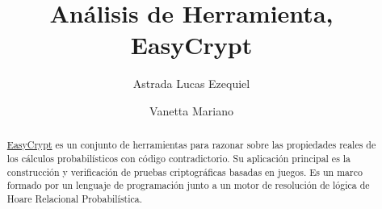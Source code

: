 \documentclass[runningheads,a4paper]{llncs}
\begin{document}
\mainmatter  %

\title{Análisis de Herramienta, EasyCrypt}


%
%
\author
{
Astrada Lucas Ezequiel
\and
Vanetta Mariano
}
%


%
%

\maketitle


\begin{abstract}    
\href{https://www.easycrypt.info/trac/}{EasyCrypt} es un conjunto de herramientas para razonar sobre las propiedades reales de los cálculos probabilísticos con código contradictorio. Su aplicación principal es la construcción y verificación de pruebas criptográficas basadas en juegos. 
Es un marco formado por un lenguaje de programación junto a un motor de resolución de lógica de Hoare Relacional Probabilística.
\cite{article2}


\end{abstract}
\end{document}
